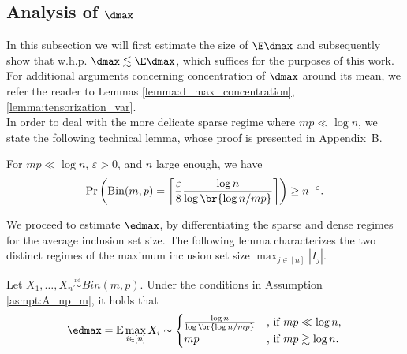 \subsection{Analysis of \(\dmax\)}\label{sec:d_max}
In this subsection we will first estimate the size of $\E \dmax$ and subsequently show that w.h.p. $\dmax \lesssim \E \dmax$, which suffices for the purposes of this work. For additional arguments concerning concentration of $\dmax$ around its mean, we refer the reader to Lemmas  \ref{lemma:d_max_concentration}, \ref{lemma:tensorization_var}.\\
\noindent
In order to deal with the more delicate sparse regime where $mp \ll \log n$, we state the following technical lemma, whose proof is presented in Appendix~B. 
%
\begin{lemma}
\label{lemma:mp<logn_conquering_logn}
For $mp \ll \log{n}$, $\varepsilon > 0$, and $n$ large enough, we have 
\begin{equation*}
\Pr\left(\mathrm{Bin}(m, p) = \left\lceil{\frac{\varepsilon}{8} \frac{\log{n}}{\log\br{\log n / mp}}}\right\rceil \right) \geq n^{-\varepsilon}.
\end{equation*}
\end{lemma}
%
\noindent 
We proceed to estimate $\edmax$, by differentiating the sparse and dense regimes for the average inclusion set size. The following lemma characterizes the two distinct regimes of the maximum inclusion set size $\max_{j \in [n]} |I_j|$. 
\begin{lemma} \label{lemma:maximal_ineq}
Let $X_1, \ldots, X_n  \overset{\underset{\mathrm{iid}}{}}{\sim} Bin(m,p)$. Under the conditions in Assumption \ref{asmpt:A_np_m}, it holds that
\begin{align*}
\edmax = \mathbb{E}\max_{i \in [n]}X_i \sim \begin{cases}
        \frac{\log{n}}{\log\br{\log n / mp}} & \text{, if } mp \ll \log{n},\\
        mp & \text{, if } mp \gtrsim \log{n}.
    \end{cases}
\end{align*}
\end{lemma}
%

